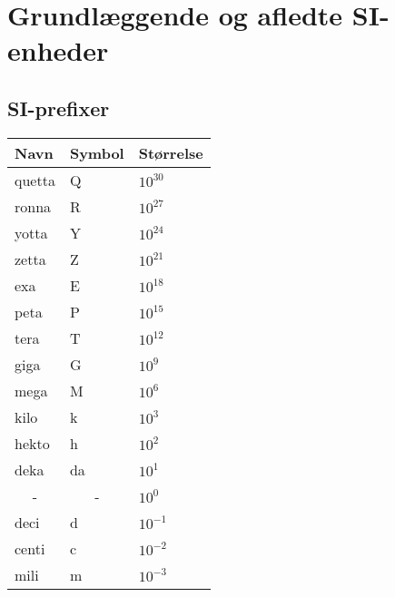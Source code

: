\section{Grundlæggende og afledte SI-enheder}

\subsection{SI-prefixer}
\begin{table}[ht]
\begin{tabular}{|l|l|l|}
\hline
\textbf{Navn}           & \textbf{Symbol}        & \textbf{Størrelse} \\ \hline
quetta                  & Q                      & $10^{30}$          \\ \hline
ronna                   & R                      & $10^{27}$          \\ \hline
yotta                   & Y                      & $10^{24}$          \\ \hline
zetta                   & Z                      & $10^{21}$          \\ \hline
exa                     & E                      & $10^{18}$          \\ \hline
peta                    & P                      & $10^{15}$          \\ \hline
tera                    & T                      & $10^{12}$          \\ \hline
giga                    & G                      & $10^9$             \\ \hline
mega                    & M                      & $10^6$             \\ \hline
kilo                    & k                      & $10^3$             \\ \hline
hekto                   & h                      & $10^2$             \\ \hline
deka                    & da                     & $10^1$             \\ \hline
\multicolumn{1}{|c|}{-} & \multicolumn{1}{c|}{-} & $10^0$             \\ \hline
deci                    & d                      & $10^{-1}$          \\ \hline
centi                   & c                      & $10^{-2}$          \\ \hline
mili                    & m                      & $10^{-3}$          \\ \hline

\end{tabular}
\end{table}
